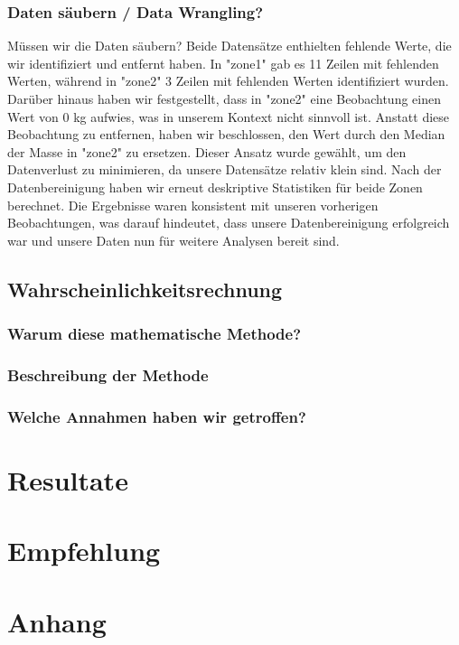 \documentclass[a4paper,10pt]{report}
\begin{document}
    \subsection{Daten säubern / Data Wrangling?}
    Müssen wir die Daten säubern?
    Beide Datensätze enthielten fehlende Werte, die wir identifiziert und entfernt haben. In "zone1" gab es 11 Zeilen mit fehlenden Werten, während in "zone2" 3 Zeilen mit fehlenden Werten identifiziert wurden.
    Darüber hinaus haben wir festgestellt, dass in "zone2" eine Beobachtung einen Wert von 0 kg aufwies, was in unserem Kontext nicht sinnvoll ist. 
    Anstatt diese Beobachtung zu entfernen, haben wir beschlossen, den Wert durch den Median der Masse in "zone2" zu ersetzen. 
    Dieser Ansatz wurde gewählt, um den Datenverlust zu minimieren, da unsere Datensätze relativ klein sind.
    Nach der Datenbereinigung haben wir erneut deskriptive Statistiken für beide Zonen berechnet. 
    Die Ergebnisse waren konsistent mit unseren vorherigen Beobachtungen, was darauf hindeutet, dass unsere Datenbereinigung erfolgreich war und unsere Daten nun für weitere Analysen bereit sind.


    \section{Wahrscheinlichkeitsrechnung}

    \subsection{Warum diese mathematische Methode?}

    \subsection{Beschreibung der Methode}

    \subsection{Welche Annahmen haben wir getroffen?}


    \chapter{Resultate}


    \chapter{Empfehlung}


    \chapter{Anhang}
\end{document}
